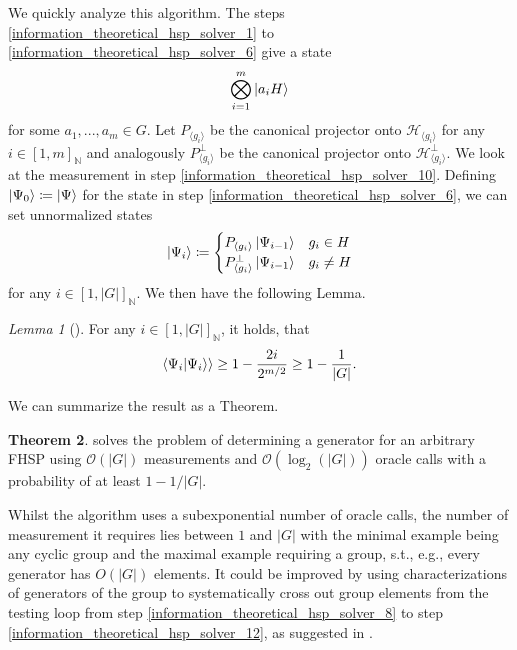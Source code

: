 \documentclass[10pt]{amsart}
\theoremstyle{definition}
\newtheorem{theorem}{Theorem}
\theoremstyle{remark}
\newtheorem{lemma}[theorem]{Lemma}
\newcommand{\onot}{\mathcal{O}}
\begin{document}
    We quickly analyze this algorithm. The steps \ref{information_theoretical_hsp_solver_1} to \ref{information_theoretical_hsp_solver_6} give a state
    \begin{align}
        \bigotimes_{i=1}^m \ket{a_iH}
    \end{align}
    for some \(a_1, ..., a_m \in G\). Let \(P_{\langle g_i \rangle}\) be the canonical projector onto \(\mathcal{H}_{\langle g_i \rangle}\) for any \(i \in [1, m]_{\mathbb{N}}\) and analogously \(P_{\langle g_i \rangle}^\perp\) be the canonical projector onto \(\mathcal{H}_{\langle g_i \rangle}^\perp\). We look at the measurement in step \ref{information_theoretical_hsp_solver_10}. Defining \(\ket{\Psi_0} \coloneqq \ket{\Psi}\) for the state in step \ref{information_theoretical_hsp_solver_6}, we can set unnormalized states
    \begin{align}
        \ket{\Psi_i} \coloneqq \begin{cases}
            P_{\langle g_i \rangle}\ket{\Psi_{i-1}} & g_i \in H\\
            P_{\langle g_i \rangle}^\perp\ket{\Psi_{i-1}} & g_i \neq H
        \end{cases}
    \end{align}
    for any \(i \in [1, |G|]_{\mathbb{N}}\). We then have the following Lemma.
    \begin{lemma}[{\cite[pp. 3-4]{Ettinger1999a}}]
        For any \(i \in [1, |G|]_{\mathbb{N}}\), it holds, that
        \begin{align}
            \braket{\Psi_i}{\Psi_i} \rangle \geq 1 - \frac{2i}{2^{m/2}} \geq 1 - \frac{1}{|G|}.
        \end{align}
    \end{lemma}
    We can summarize the result as a Theorem.
    \begin{theorem}
         solves the problem of determining a generator for an arbitrary FHSP using \(\onot(|G|)\) measurements and \(\onot(\log_2(|G|))\) oracle calls with a probability of at least \(1 - 1/|G|\).
    \end{theorem}
    Whilst the algorithm uses a subexponential number of oracle calls, the number of measurement it requires lies between \(1\) and \(|G|\) with the minimal example being any cyclic group and the maximal example requiring a group, s.t., e.g., every generator has \(O(|G|)\) elements. It could be improved by using characterizations of generators of the group to systematically cross out group elements from the testing loop from step \ref{information_theoretical_hsp_solver_8} to step \ref{information_theoretical_hsp_solver_12}, as suggested in \cite[p. 3]{Ettinger1999a}.
\end{document}
